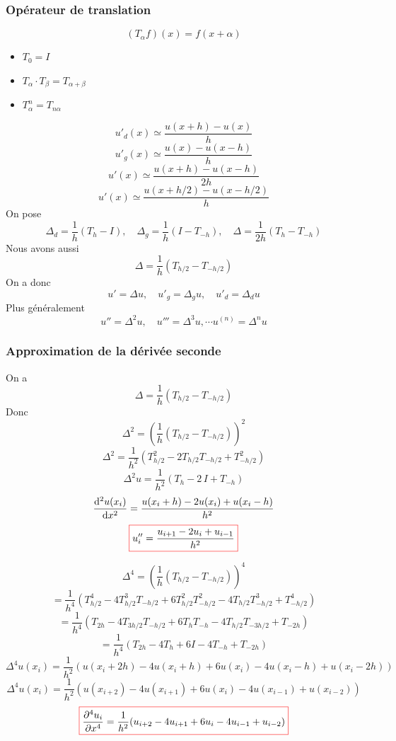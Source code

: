 \documentclass{beamer}
\def \de {{\rm d}}
\newcommand{\myredbox}[1]{\fcolorbox{red}{white}{$\displaystyle#1$}}
\begin{document}
\begin{frame}
\frametitle{Opérateur de translation}
\[\left(T_\alpha f\right)(x) = f(x+\alpha)\]
\begin{center}
\end{center}
\begin{itemize}
\item $T_0 =I$
\item $T_{\alpha} \cdot T_{\beta} = T_{\alpha+\beta}$
\item $T^n_{\alpha}  = T_{n\alpha}$
\end{itemize}

\end{frame}


\begin{frame}
\[u'_d(x)\simeq  \frac{u(x+h)-u(x)}{h}\]
\[u'_g(x)\simeq  \frac{u(x)-u(x-h)}{h}\]
\[u'(x)\simeq  \frac{u(x+h)-u(x-h)}{2h}\]
\[u'(x)\simeq  \frac{u(x+h/2)-u(x-h/2)}{h}\]
On pose \[\Delta_d =\frac 1h(T_{h}-I),\quad \Delta_g =\frac 1h(I-T_{-h}),\quad \Delta =\frac 1{2h}(T_{h}-T_{-h})\]
Nous avons aussi
\[\Delta =\frac 1{h}(T_{h/2}-T_{-h/2})\]
On a donc \[u'=\Delta u, \quad u'_g=\Delta_g u, \quad u'_d=\Delta_d u\]
Plus généralement
\[u'' =\Delta^2u,\quad u''' =\Delta^3u,\cdots u^{(n)}=\Delta^nu\]
\end{frame}

\begin{frame}
\frametitle{Approximation de la dérivée seconde}
On a
\[\Delta =\frac 1h(T_{h/2}-T_{-h/2})\]
Donc
\[\Delta^2=\left(\frac 1h(T_{h/2}-T_{-h/2})\right)^2\]
\[\Delta^2=\frac 1{h^2}(T_{h/2}^2-2T_{h/2}T_{-h/2} +T_{-h/2}^2)\]
\[\Delta^2u=\frac 1{h^2}(T_h-2\,I+T_{-h})\]
\[\frac{\de^2u(x_i)}{\de x^2} =\frac {u(x_i+h)-2u(x_i)+u(x_i-h)}{h^2}\]
\[\myredbox{u''_i=\frac {u_{i+1}-2u_i+u_{i-1}}{h^2}}\]

\end{frame}
\begin{frame}

\[\Delta^4=\left(\frac 1h(T_{h/2}-T_{-h/2})\right)^4\]\[=\frac 1{h^4}(T^4_{h/2}-4T^3_{h/2}T_{-h/2}+6T^2_{h/2}T^2_{-h/2}-4T_{h/2}T^3_{-h/2}+T^4_{-h/2})\]
\[=\frac 1{h^4}(T_{2h}-4T_{3h/2}T_{-h/2}+6T_{h}T_{-h}-4T_{h/2}T_{-3h/2}+T_{-2h})\]
\[=\frac 1{h^4}(T_{2h}-4T_{h}+6I-4T_{-h}+T_{-2h})\]
\[\Delta^4u(x_i)=\frac 1{h^2}(u(x_i+2h)-4u(x_i+h)+6u(x_i)-4u(x_i-h)+u(x_i-2h))\]
\[\Delta^4u(x_i)=\frac 1{h^2}(u(x_{i+2})-4u(x_{i+1})+6u(x_i)-4u(x_{i-1})+u(x_{i-2}))\]
\[\myredbox{\frac{\partial^4 u_i}{\partial x^4}=\frac 1{h^2}(u_{i+2}-4u_{i+1}+6u_i-4u_{i-1}+u_{i-2})}\]

\end{frame}
\end{document}
